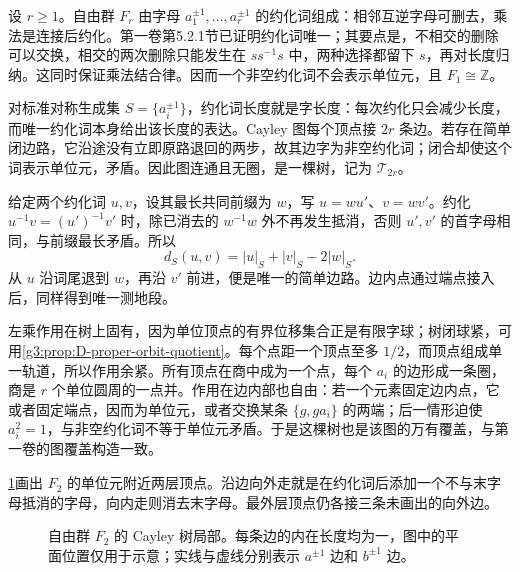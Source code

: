 \begin{example}\label{g3:exm:D-free-group-tree}
	设 \(r\ge1\)。自由群 \(F_r\) 由字母 \(a_1^{\pm1},\ldots,a_r^{\pm1}\) 的约化词组成：相邻互逆字母可删去，乘法是连接后约化。第一卷第5.2.1节已证明约化词唯一；其要点是，不相交的删除可以交换，相交的两次删除只能发生在 \(ss^{-1}s\) 中，两种选择都留下 \(s\)，再对长度归纳。这同时保证乘法结合律。因而一个非空约化词不会表示单位元，且 \(F_1\cong\mathbb Z\)。

	对标准对称生成集 \(S=\{a_i^{\pm1}\}\)，约化词长度就是字长度：每次约化只会减少长度，而唯一约化词本身给出该长度的表达。Cayley 图每个顶点接 \(2r\) 条边。若存在简单闭边路，它沿途没有立即原路退回的两步，故其边字为非空约化词；闭合却使这个词表示单位元，矛盾。因此图连通且无圈，是一棵树，记为 \(\mathcal T_{2r}\)。

	给定两个约化词 \(u,v\)，设其最长共同前缀为 \(w\)，写
	\(u=wu'\)、\(v=wv'\)。约化 \(u^{-1}v=(u')^{-1}v'\) 时，除已消去的 \(w^{-1}w\) 外不再发生抵消，否则 \(u',v'\) 的首字母相同，与前缀最长矛盾。所以
	\begin{equation}\label{g3:eq:D-free-tree-distance}
		d_S(u,v)=|u|_S+|v|_S-2|w|_S.
	\end{equation}
	从 \(u\) 沿词尾退到 \(w\)，再沿 \(v'\) 前进，便是唯一的简单边路。边内点通过端点接入后，同样得到唯一测地段。

	左乘作用在树上固有，因为单位顶点的有界位移集合正是有限字球；树闭球紧，可用\cref{g3:prop:D-proper-orbit-quotient}。每个点距一个顶点至多 \(1/2\)，而顶点组成单一轨道，所以作用余紧。所有顶点在商中成为一个点，每个 \(a_i\) 的边形成一条圈，商是 \(r\) 个单位圆周的一点并。作用在边内部也自由：若一个元素固定边内点，它或者固定端点，因而为单位元，或者交换某条 \(\{g,ga_i\}\) 的两端；后一情形迫使 \(a_i^2=1\)，与非空约化词不等于单位元矛盾。于是这棵树也是该图的万有覆盖，与第一卷的图覆盖构造一致。
\end{example}

\cref{g3:fig:D-free-tree}画出 \(F_2\) 的单位元附近两层顶点。沿边向外走就是在约化词后添加一个不与末字母抵消的字母，向内走则消去末字母。最外层顶点仍各接三条未画出的向外边。
\begin{figure}[htbp]
	\centering
	
	\caption{自由群 \(F_2\) 的 Cayley 树局部。每条边的内在长度均为一，图中的平面位置仅用于示意；实线与虚线分别表示 \(a^{\pm1}\) 边和 \(b^{\pm1}\) 边。}
	\label{g3:fig:D-free-tree}
\end{figure}

